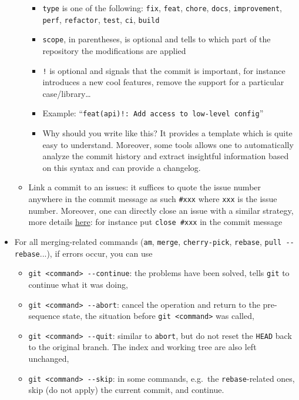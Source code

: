 \documentclass[a4paper,12pt,%
              final%
              ]{article}
\begin{document}
\begin{itemize}
\begin{itemize}
\begin{itemize}
          \item \texttt{type} is one of the following: \texttt{fix}, \texttt{feat}, \texttt{chore}, \texttt{docs}, \texttt{improvement}, \texttt{perf}, \texttt{refactor}, \texttt{test}, \texttt{ci}, \texttt{build}
          \item \texttt{scope}, in parentheses, is optional and tells to which part of the repository the modifications are applied
          \item \texttt{!} is optional and signals that the commit is important, for instance introduces a new cool features, remove the support for a particular case/library\ldots
          \item Example: ``\texttt{feat(api)!: Add access to low-level config}''
          \item Why should you write like this? It provides a template which is quite easy to understand. Moreover, some tools allows one to automatically analyze the commit history and extract insightful information based on this syntax and can provide a changelog.
        \end{itemize}
      \item Link a commit to an issues: it suffices to quote the issue number anywhere in the commit message as such \verb|#xxx| where \texttt{xxx} is the issue number. Moreover, one can directly close an issue with a similar strategy, more details \href{https://docs.github.com/en/issues/tracking-your-work-with-issues/linking-a-pull-request-to-an-issue}{here}: for instance put \verb|close #xxx| in the commit message
    \end{itemize}
  \item For all merging-related commands (\texttt{am}, \texttt{merge}, \texttt{cherry-pick}, \texttt{rebase}, \verb|pull --rebase|...), if errors occur, you can use
    \begin{itemize}
      \item \verb|git <command> --continue|: the problems have been solved, tells \texttt{git} to continue what it was doing,
      \item \verb|git <command> --abort|: cancel the operation and return to the pre-sequence state, the situation before \texttt{git <command>} was called,
      \item \verb|git <command> --quit|: similar to \texttt{abort}, but do not reset the \texttt{HEAD} back to the original branch. The index and working tree are also left unchanged,
      \item \verb|git <command> --skip|: in some commands, e.g.\ the \texttt{rebase}-related ones, skip (do not apply) the current commit, and continue.

\end{itemize}
\end{itemize}
\end{document}
